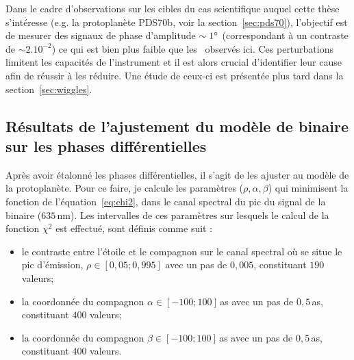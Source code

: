 Dans le cadre d'observations sur les cibles du cas scientifique auquel cette thèse s'intéresse (e.g. la protoplanète PDS70b, voir la section~\ref{sec:pds70}), l'objectif est de mesurer des signaux de phase d'amplitude $\sim 1^{\circ}$ (correspondant à un contraste de $\sim 2.10^{-2}$) ce qui est bien plus faible que les \wiggles~observés ici. Ces perturbations limitent les capacités de l'instrument et il est alors crucial d'identifier leur cause afin de réussir à les réduire. Une étude de ceux-ci est présentée plus tard dans la section~\ref{sec:wiggles}.


\subsection{Résultats de l'ajustement du modèle de binaire sur les phases différentielles}

Après avoir étalonné les phases différentielles, il s'agit de les ajuster au modèle de la protoplanète. Pour ce faire, je calcule les paramètres ($\rho, \alpha, \beta$) qui minimisent la fonction de l'équation~\ref{eq:chi2}, dans le canal spectral du pic du signal de la binaire ($635 \,$nm). Les intervalles de ces paramètres sur lesquels le calcul de la fonction $\chi^2$ est effectué, sont définis comme suit :

\begin{itemize}
    \item le contraste entre l'étoile et le compagnon sur le canal spectral où se situe le pic d'émission, $\rho \in [0,05; 0,995]$ avec un pas de $0,005$, constituant $190$ valeurs;
    \item la coordonnée du compagnon $\alpha \in [-100; 100]\,$as avec un pas de $0,5 \,$as, constituant $400$ valeurs;
    \item la coordonnée du compagnon $\beta \in [-100; 100]\,$as avec un pas de $0,5 \,$as, constituant $400$ valeurs.
\end{itemize}

